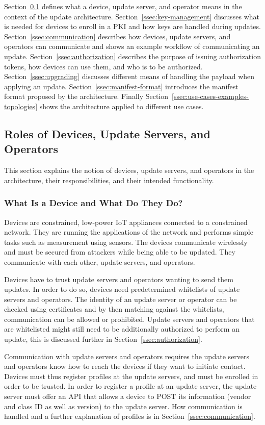 \documentclass[0-thesis.tex]{subfiles}
\begin{document}
Section~\ref{ssec:roles} defines what a device, update server, and operator means in the
context of the update architecture. Section~\ref{ssec:key-management} discusses what is
needed for devices to enroll in a PKI and how keys are handled during updates.
Section~\ref{ssec:communication} describes how devices, update servers, and operators can
communicate and shows an example workflow of communicating an update.
Section~\ref{ssec:authorization} describes the purpose of issuing authorization tokens,
how devices can use them, and who is to be authorized. Section~\ref{ssec:upgrading}
discusses different means of handling the payload when applying an update.
Section~\ref{ssec:manifest-format} introduces the manifest format proposed by the
architecture. Finally Section~\ref{ssec:use-cases-examples-topologies} shows the
architecture applied to different use cases.

\subsection{Roles of Devices, Update Servers, and Operators}
\label{ssec:roles}
This section explains the notion of devices, update servers, and operators in the
architecture, their responsibilities, and their intended functionality.

\subsubsection{What Is a Device and What Do They Do?}
\label{sssec:what-is-a-device}
Devices are constrained, low-power IoT appliances connected to a constrained network. They
are running the applications of the network and performs simple tasks such as measurement
using sensors. The devices communicate wirelessly and must be secured from attackers while
being able to be updated. They communicate with each other, update servers, and operators.

Devices have to trust update servers and operators wanting to send them updates. In order
to do so, devices need predetermined whitelists of update servers and operators. The
identity of an update server or operator can be checked using certificates and by then
matching against the whitelists, communication can be allowed or prohibited. Update
servers and operators that are whitelisted might still need to be additionally authorized
to perform an update, this is discussed further in Section~\ref{ssec:authorization}.

Communication with update servers and operators requires the update servers and operators
know how to reach the devices if they want to initiate contact. Devices must thus register
profiles at the update servers, and must be enrolled in order to be trusted. In order to
register a profile at an update server, the update server must offer an API that allows a
device to POST its information (vendor and class ID as well as version) to the update
server. How communication is handled and a further explanation of profiles is in
Section~\ref{ssec:communication}.
\end{document}
